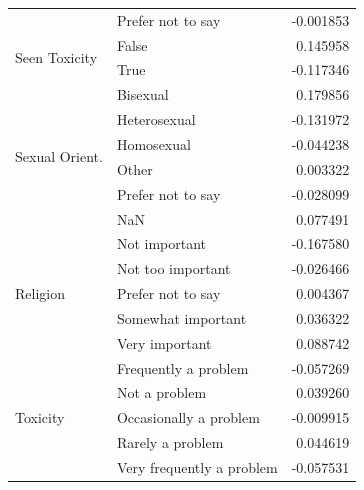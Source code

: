 \begin{table}
\begin{tabular}{llr}
 & Prefer not to say & -0.001853 \\
\cline{1-3}
\multirow[t]{2}{*}{Seen Toxicity} & False & 0.145958 \\
 & True & -0.117346 \\
\cline{1-3}
\multirow[t]{6}{*}{Sexual Orient.} & Bisexual & 0.179856 \\
 & Heterosexual & -0.131972 \\
 & Homosexual & -0.044238 \\
 & Other & 0.003322 \\
 & Prefer not to say & -0.028099 \\
 & NaN & 0.077491 \\
\cline{1-3}
\multirow[t]{5}{*}{Religion} & Not important & -0.167580 \\
 & Not too important & -0.026466 \\
 & Prefer not to say & 0.004367 \\
 & Somewhat important & 0.036322 \\
 & Very important & 0.088742 \\
\cline{1-3}
\multirow[t]{5}{*}{Toxicity} & Frequently a problem & -0.057269 \\
 & Not a problem & 0.039260 \\
 & Occasionally a problem & -0.009915 \\
 & Rarely a problem & 0.044619 \\
 & Very frequently a problem & -0.057531 \\
\cline{1-3}
\bottomrule
\end{tabular}
\end{table}
